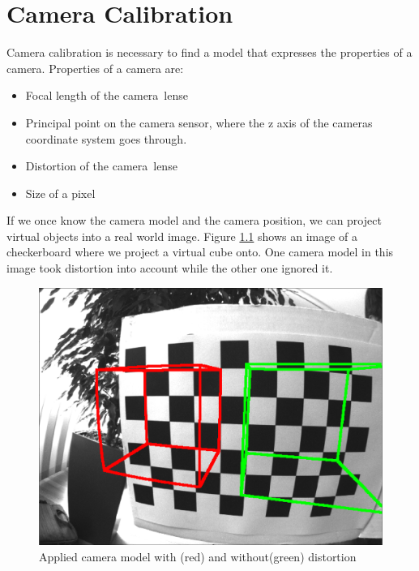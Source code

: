 \documentclass[11pt,a4paper,titlepage,oneside]{report}
\begin{document}
\chapter{Camera Calibration}

Camera calibration is necessary to find a model that expresses the properties of a camera. Properties of a camera are:

\begin{itemize}
	\item Focal length of the camera lense
	\item Principal point on the camera sensor, where the z axis of the cameras coordinate system goes through.
	\item Distortion of the camera lense
	\item Size of a pixel
\end{itemize}

If we once know the camera model and the camera position, we can project virtual objects into a real world image. Figure \ref{fig:model} shows an image of a checkerboard where we project a virtual cube onto. One camera model in this image took distortion into account while the other one ignored it.
\begin{figure}[H]
  \begin{center}
		\includegraphics[width=1.0\textwidth]{img/model.png}
  \end{center}
	\caption{Applied camera model with (red) and without(green) distortion}\label{fig:model}
\end{figure}
\end{document}
